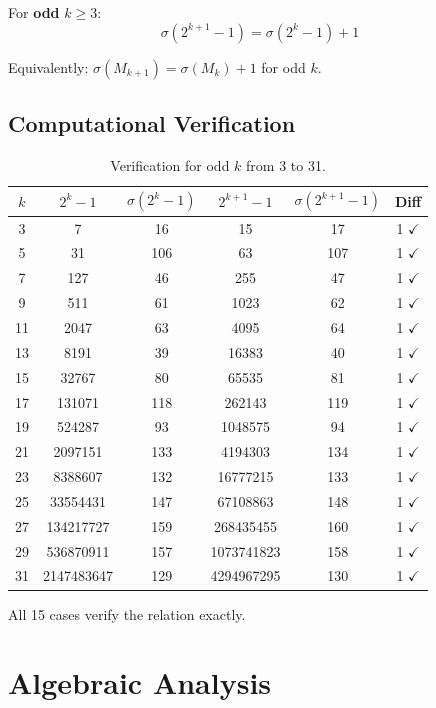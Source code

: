 \documentclass[twocolumn,prl,aps,superscriptaddress]{revtex4-2}
\begin{document}
For \textbf{odd} $k \geq 3$:
\begin{equation}
\boxed{\sigma(2^{k+1} - 1) = \sigma(2^k - 1) + 1}
\end{equation}

Equivalently: $\sigma(M_{k+1}) = \sigma(M_k) + 1$ for odd $k$.

\subsection{Computational Verification}

\begin{table}[h]
\centering
\begin{tabular}{cccccc}
\hline
$k$ & $2^k-1$ & $\sigma(2^k-1)$ & $2^{k+1}-1$ & $\sigma(2^{k+1}-1)$ & Diff \\
\hline
3 & 7 & 16 & 15 & 17 & 1 $\checkmark$ \\
5 & 31 & 106 & 63 & 107 & 1 $\checkmark$ \\
7 & 127 & 46 & 255 & 47 & 1 $\checkmark$ \\
9 & 511 & 61 & 1023 & 62 & 1 $\checkmark$ \\
11 & 2047 & 63 & 4095 & 64 & 1 $\checkmark$ \\
13 & 8191 & 39 & 16383 & 40 & 1 $\checkmark$ \\
15 & 32767 & 80 & 65535 & 81 & 1 $\checkmark$ \\
17 & 131071 & 118 & 262143 & 119 & 1 $\checkmark$ \\
19 & 524287 & 93 & 1048575 & 94 & 1 $\checkmark$ \\
21 & 2097151 & 133 & 4194303 & 134 & 1 $\checkmark$ \\
23 & 8388607 & 132 & 16777215 & 133 & 1 $\checkmark$ \\
25 & 33554431 & 147 & 67108863 & 148 & 1 $\checkmark$ \\
27 & 134217727 & 159 & 268435455 & 160 & 1 $\checkmark$ \\
29 & 536870911 & 157 & 1073741823 & 158 & 1 $\checkmark$ \\
31 & 2147483647 & 129 & 4294967295 & 130 & 1 $\checkmark$ \\
\hline
\end{tabular}
\caption{Verification for odd $k$ from 3 to 31.}
\end{table}

All 15 cases verify the relation exactly.

\section{Algebraic Analysis}
\end{document}
